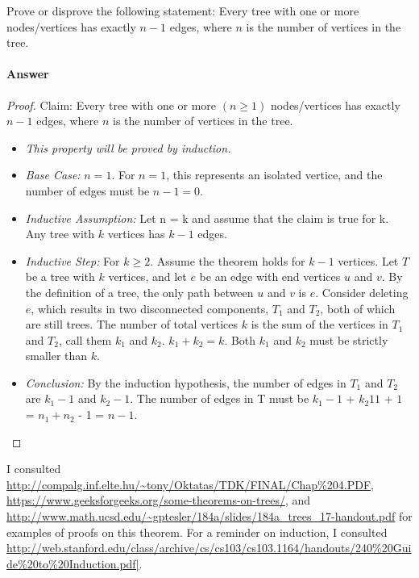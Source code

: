 \documentclass{article}
\begin{document}

Prove or disprove the following statement: Every tree with one or more
nodes/vertices has exactly $n-1$ edges, where $n$ is the number of vertices in
the tree.

\paragraph{Answer}
\begin{proof}{Claim:}{ Every tree with one or more $(n \geq 1)$ nodes/vertices has exactly $n-1$ edges, where $n$ is the number of vertices in the tree.} 
\begin{itemize}
\item \emph{This property will be proved by induction.} 
\item \emph{Base Case:}{ $n = 1$. For $n = 1$, this represents an isolated vertice, and the number of edges must be $n - 1 = 0$.}
\item \emph{Inductive Assumption:}{ Let n = k and assume that the claim is true for k. Any tree with $k$ vertices has $k-1$ edges.}
\item \emph{Inductive Step:}{ For $k \geq 2$. Assume the theorem holds for $k-1$ vertices. Let $T$ be a tree with $k$ vertices, and let $e$ be an edge with end vertices $u$ and $v$. By the definition of a tree, the only path between $u$ and $v$ is $e$. Consider deleting $e$, which results in two disconnected components, $T_1$ and $T_2$, both of which are still trees. The number of total vertices $k$ is the sum of the vertices in $T_1$ and $T_2$, call them $k_1$ and $k_2$. $k_1 + k_2 = k$. Both $k_1$ and $k_2$ must be strictly smaller than $k$.} 
\item \emph{Conclusion:}{ By the induction hypothesis, the number of edges in $T_1$ and $T_2$ are $k_1 - 1$ and $k_2 - 1$. The number of edges in T must be $k_1 - 1$ + $k_2 1 1$ + $1$ = $n_1 + n_2$ - 1 = $n - 1$.}
\end{itemize}
\end{proof}

I consulted \url{http://compalg.inf.elte.hu/~tony/Oktatas/TDK/FINAL/Chap\%204.PDF}, \url{https://www.geeksforgeeks.org/some-theorems-on-trees/}, and \url{http://www.math.ucsd.edu/~gptesler/184a/slides/184a_trees_17-handout.pdf} for examples of proofs on this theorem. For a reminder on induction, I consulted \url{http://web.stanford.edu/class/archive/cs/cs103/cs103.1164/handouts/240\%20Guide\%20to\%20Induction.pdf|}.
\end{document}
